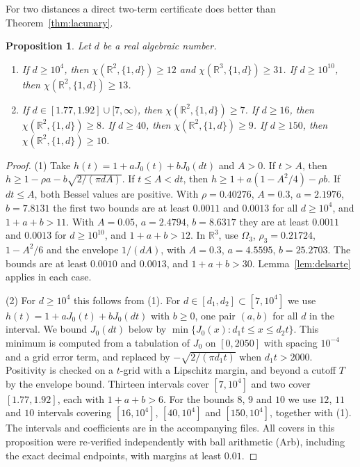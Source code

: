 \documentclass[11pt]{amsart}
\newtheorem{proposition}[theorem]{Proposition}
\theoremstyle{definition}
\newcommand{\R}{\mathbb{R}}
\begin{document}
For two distances a direct two-term certificate does better than Theorem~\ref{thm:lacunary}.

\begin{proposition}\label{prop:twodist}
Let $d$ be a real algebraic number.
\begin{enumerate}
\item If $d\ge10^4$, then $\chi(\R^2,\{1,d\})\ge12$ and $\chi(\R^3,\{1,d\})\ge31$. If $d\ge10^{10}$, then $\chi(\R^2,\{1,d\})\ge13$.
\item If $d\in[1.77,1.92]\cup[7,\infty)$, then $\chi(\R^2,\{1,d\})\ge7$. If $d\ge16$, then $\chi(\R^2,\{1,d\})\ge8$. If $d\ge40$, then $\chi(\R^2,\{1,d\})\ge9$. If $d\ge150$, then $\chi(\R^2,\{1,d\})\ge10$.
\end{enumerate}
\end{proposition}

\begin{proof}
(1) Take $h(t)=1+aJ_0(t)+bJ_0(dt)$ and $A>0$. If $t>A$, then $h\ge1-\rho a-b\sqrt{2/(\pi dA)}$. If $t\le A<dt$, then $h\ge1+a(1-A^2/4)-\rho b$. If $dt\le A$, both Bessel values are positive. With $\rho=0.40276$, $A=0.3$, $a=2.1976$, $b=7.8131$ the first two bounds are at least $0.0011$ and $0.0013$ for all $d\ge10^4$, and $1+a+b>11$. With $A=0.05$, $a=2.4794$, $b=8.6317$ they are at least $0.0011$ and $0.0013$ for $d\ge10^{10}$, and $1+a+b>12$. In $\R^3$, use $\Omega_3$, $\rho_3=0.21724$, $1-A^2/6$ and the envelope $1/(dA)$, with $A=0.3$, $a=4.5595$, $b=25.2703$. The bounds are at least $0.0010$ and $0.0013$, and $1+a+b>30$. Lemma~\ref{lem:delsarte} applies in each case.

(2) For $d\ge10^4$ this follows from (1). For $d\in[d_1,d_2]\subset[7,10^4]$ we use $h(t)=1+aJ_0(t)+bJ_0(dt)$ with $b\ge0$, one pair $(a,b)$ for all $d$ in the interval. We bound $J_0(dt)$ below by $\min\{J_0(x):d_1t\le x\le d_2t\}$. This minimum is computed from a tabulation of $J_0$ on $[0,2050]$ with spacing $10^{-4}$ and a grid error term, and replaced by $-\sqrt{2/(\pi d_1t)}$ when $d_1t>2000$. Positivity is checked on a $t$-grid with a Lipschitz margin, and beyond a cutoff $T$ by the envelope bound. Thirteen intervals cover $[7,10^4]$ and two cover $[1.77,1.92]$, each with $1+a+b>6$. For the bounds $8$, $9$ and $10$ we use $12$, $11$ and $10$ intervals covering $[16,10^4]$, $[40,10^4]$ and $[150,10^4]$, together with (1). The intervals and coefficients are in the accompanying files. All covers in this proposition were re-verified independently with ball arithmetic (Arb), including the exact decimal endpoints, with margins at least $0.01$.
\end{proof}
\end{document}
